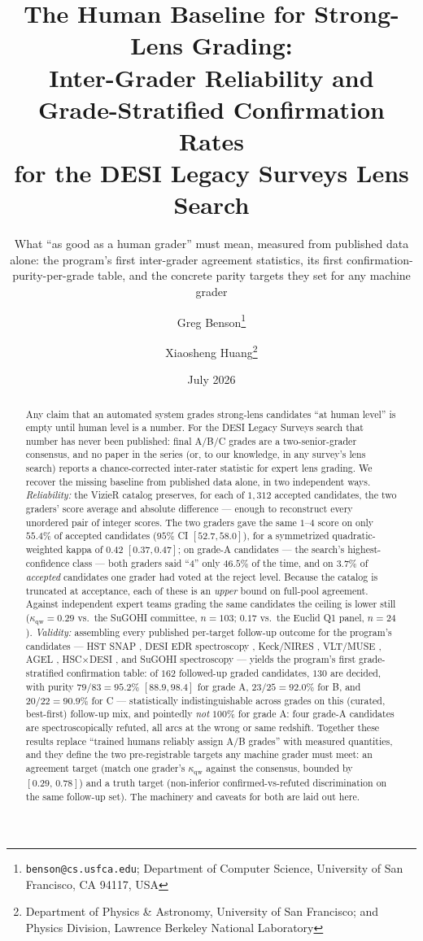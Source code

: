 \documentclass[11pt,letterpaper]{article}
\title{The Human Baseline for Strong-Lens Grading:\\
       Inter-Grader Reliability and Grade-Stratified Confirmation Rates\\
       for the DESI Legacy Surveys Lens Search}
\author{Greg Benson\thanks{\texttt{benson@cs.usfca.edu}; Department of Computer
        Science, University of San Francisco, CA 94117, USA} \and
        Xiaosheng Huang\thanks{Department of Physics \& Astronomy, University of
        San Francisco; and Physics Division, Lawrence Berkeley National Laboratory}}
\date{July 2026}
\newcommand{\qwk}{\ensuremath{\kappa_{\mathrm{qw}}}}
\begin{document}
\maketitle
\subtitle{What ``as good as a human grader'' must mean, measured from published data
alone: the program's first inter-grader agreement statistics, its first
confirmation-purity-per-grade table, and the concrete parity targets they set for any
machine grader}

\begin{abstract}
Any claim that an automated system grades strong-lens candidates ``at human level'' is empty
until human level is a number. For the DESI Legacy Surveys search
\citep{huang2020decals,huang2021desi,storfer2024dr9,inchausti2025} that number has never been
published: final A/B/C grades are a two-senior-grader consensus, and no paper in the series (or,
to our knowledge, in any survey's lens search) reports a chance-corrected inter-rater statistic
for expert lens grading. We recover the missing baseline from published data alone, in two
independent ways. \emph{Reliability:} the \citet{huang2021desi} VizieR catalog preserves, for
each of $1{,}312$ accepted candidates, the two graders' score average and absolute difference
--- enough to reconstruct every unordered pair of integer scores. The two graders gave the same
$1$--$4$ score on only $55.4\%$ of accepted candidates ($95\%$ CI $[52.7,58.0]$), for a
symmetrized quadratic-weighted kappa of $0.42$ $[0.37,0.47]$; on grade-A candidates --- the
search's highest-confidence class --- both graders said ``4'' only $46.5\%$ of the time, and on
$3.7\%$ of \emph{accepted} candidates one grader had voted at the reject level. Because the
catalog is truncated at acceptance, each of these is an \emph{upper} bound on full-pool
agreement. Against independent expert teams grading the same candidates the ceiling is lower
still ($\qwk=0.29$ vs.\ the SuGOHI committee, $n=103$; $0.17$ vs.\ the Euclid Q1 panel,
$n=24$). \emph{Validity:} assembling every published per-target follow-up outcome for the
program's candidates --- HST SNAP \citep{huang2025foundry1}, DESI EDR spectroscopy
\citep{huang2025foundry2}, Keck/NIRES \citep{agarwal2025foundry3}, VLT/MUSE
\citep{lin2025foundry4}, AGEL \citep{tran2022agel,barone2025agel}, HSC$\times$DESI
\citep{shu2025hscdesi}, and SuGOHI spectroscopy \citep{sonnenfeld2018sugohi} --- yields the
program's first grade-stratified confirmation table: of $162$ followed-up graded candidates,
$130$ are decided, with purity $79/83=95.2\%$ $[88.9,98.4]$ for grade A, $23/25=92.0\%$ for B,
and $20/22=90.9\%$ for C --- statistically indistinguishable across grades on this (curated,
best-first) follow-up mix, and pointedly \emph{not} $100\%$ for grade A: four grade-A candidates
are spectroscopically refuted, all arcs at the wrong or same redshift. Together these results
replace ``trained humans reliably assign A/B grades'' with measured quantities, and they define
the two pre-registrable targets any machine grader must meet: an agreement target (match one
grader's $\qwk$ against the consensus, bounded by $[0.29,\,0.78]$) and a truth target
(non-inferior confirmed-vs-refuted discrimination on the same follow-up set). The machinery and
caveats for both are laid out here.
\end{abstract}
\end{document}
